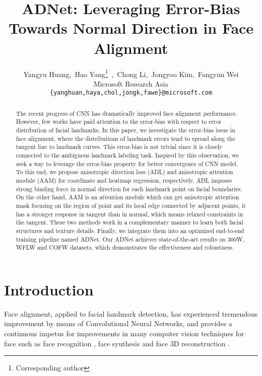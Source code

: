 \documentclass[10pt,twocolumn,letterpaper]{article}
\begin{document}
\title{ADNet: Leveraging Error-Bias Towards Normal Direction in Face Alignment}

\author{Yangyu Huang,~Hao Yang\thanks{Corresponding author}~,~Chong Li,~Jongyoo Kim,~Fangyun Wei\\
Microsoft Research Asia\\
{\tt\small \{yanghuan,haya,chol,jongk,fawe\}@microsoft.com}
}

\maketitle
\ificcvfinal\thispagestyle{empty}\fi

\begin{abstract}
  The recent progress of CNN has dramatically improved face alignment performance. 
  However, few works have paid attention to the error-bias with respect to error distribution of facial landmarks. In this paper, we investigate the error-bias issue in face alignment, where the distributions of landmark errors tend to spread along the tangent line to landmark curves.
  This error-bias is not trivial since it is closely connected to the ambiguous landmark labeling task. Inspired by this observation, we seek a way to leverage the error-bias property for better convergence of CNN model. 
  To this end, we propose anisotropic direction loss (ADL) and anisotropic attention module (AAM) for coordinate and heatmap regression, respectively.
  ADL imposes strong binding force in normal direction for each landmark point on facial boundaries.
  On the other hand, AAM is an attention module which can get anisotropic attention mask focusing on the region of point and its local edge connected by adjacent points, it has a stronger response in tangent than in normal, which means relaxed constraints in the tangent. These two methods work in a complementary manner to learn both facial structures and texture details.
  Finally, we integrate them into an optimized end-to-end training pipeline named ADNet. Our ADNet achieves state-of-the-art results on 300W, WFLW and COFW datasets, which demonstrates the effectiveness and robustness.
\end{abstract}

\section{Introduction}
\label{section:introduction}
Face alignment, applied to facial landmark detection, has experienced tremendous improvement by means of Convolutional Neural Networks, and provides a continuous impetus for improvements in many computer vision techniques for face such as face recognition \cite{masi2018deep}, face synthesis \cite{bao2018towards,gu2019mask} and face 3D reconstruction \cite{jiang2005efficient}.
\end{document}
